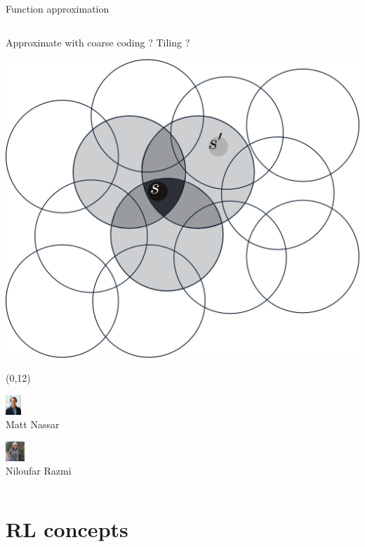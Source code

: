 \documentclass[bigger]{beamer}
\begin{document}
\begin{frame}[label={sec:orgdd2c3d9}]{Function approximation}
\begin{columns}
\begin{column}{0.5\columnwidth}
\center
\scriptsize
Approximate with coarse coding ? Tiling ?
\normalsize
\begin{center}
\includegraphics[height=0.25\textheight]{img/coarse-coding.png}
\end{center}

\begin{textblock}{5}(0,12)
\begin{minipage}[t]{3em}
\center
\includegraphics[height=2em]{img/matt-nassar.jpg}\\
\scriptsize
Matt Nassar
\end{minipage}
\begin{minipage}[t]{3em}
\center
\includegraphics[height=2em]{img/niloufar-razmi.jpeg}\\
\scriptsize
Niloufar Razmi
\end{minipage}
\end{textblock}
\end{column}
\end{columns}
\end{frame}

\section{RL concepts}
\label{sec:org9b35afe}
\end{document}
